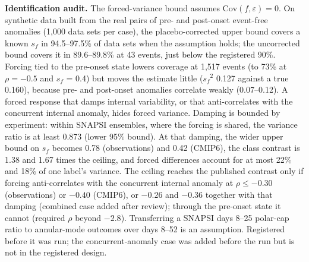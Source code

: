 \documentclass[11pt]{article}
\begin{document}
\textbf{Identification audit.} The forced-variance bound assumes $\mathrm{Cov}(f, \varepsilon) = 0$. On synthetic data built from the real pairs of pre- and post-onset event-free anomalies (1,000 data sets per case), the placebo-corrected upper bound covers a known $s_f$ in 94.5–97.5\% of data sets when the assumption holds; the uncorrected bound covers it in 89.6–89.8\% at 43 events, just below the registered 90\%. Forcing tied to the pre-onset state lowers coverage at 1,517 events (to 73\% at $\rho = -0.5$ and $s_f$ = 0.4) but moves the estimate little ($s_f$$^2$ 0.127 against a true 0.160), because pre- and post-onset anomalies correlate weakly (0.07–0.12). A forced response that damps internal variability, or that anti-correlates with the concurrent internal anomaly, hides forced variance. Damping is bounded by experiment: within SNAPSI ensembles, where the forcing is shared, the variance ratio is at least 0.873 (lower 95\% bound). At that damping, the wider upper bound on $s_f$ becomes 0.78 (observations) and 0.42 (CMIP6), the class contrast is 1.38 and 1.67 times the ceiling, and forced differences account for at most 22\% and 18\% of one label's variance. The ceiling reaches the published contrast only if forcing anti-correlates with the concurrent internal anomaly at $\rho \le -0.30$ (observations) or $-0.40$ (CMIP6), or $-0.26$ and $-0.36$ together with that damping (combined case added after review); through the pre-onset state it cannot (required $\rho$ beyond $-2.8$). Transferring a SNAPSI days 8–25 polar-cap ratio to annular-mode outcomes over days 8–52 is an assumption. Registered before it was run; the concurrent-anomaly case was added before the run but is not in the registered design.
\end{document}
